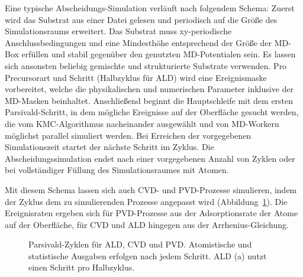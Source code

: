 Eine typische Abscheidungs-Simulation verläuft nach folgendem Schema:
Zuerst wird das Substrat aus einer Datei gelesen und periodisch auf die Größe des Simulationsraums erweitert.
Das Substrat muss xy-periodische Anschlussbedingungen und eine Mindesthöhe entsprechend der Größe der MD-Box erfüllen und stabil gegenüber den genutzten MD-Potentialen sein.
Es lassen sich ansonsten beliebig gemischte und strukturierte Substrate verwenden.
Pro Precursorart und Schritt (Halbzyklus für ALD) wird eine Ereignismaske vorbereitet, welche die physikalischen und numerischen Parameter inklusive der MD-Masken beinhaltet.
Anschließend beginnt die Hauptschleife mit dem ersten Parsivald-Schritt, in dem mögliche Ereignisse auf der Oberfläche gesucht werden, die vom KMC-Algorithmus nacheinander ausgewählt und von MD-Workern möglichst parallel simuliert werden.
Bei Erreichen der vorgegebenen Simulationszeit startet der nächste Schritt im Zyklus.
Die Abscheidungssimulation endet nach einer vorgegebenen Anzahl von Zyklen oder bei vollständiger Füllung des Simulationsraumes mit Atomen.

Mit diesem Schema lassen sich auch CVD- und PVD-Prozesse simulieren, indem der Zyklus dem zu simulierenden Prozesse angepasst wird (Abbildung~\ref{fig:parsivald-modes}).
Die Ereignisraten ergeben sich für PVD-Prozesse aus der Adsorptionsrate der Atome auf der Oberfläche, für CVD und ALD hingegen aus der Arrhenius-Gleichung.

\begin{figure}[hbp]
  \captionsetup[subfigure]{singlelinecheck=false}
  \begin{subfigure}[t]{5.7cm}
    \def\svgwidth{\textwidth}
    
  \end{subfigure}
  \hfill
  \begin{subfigure}[t]{4.7cm}
    \def\svgwidth{\textwidth}
    
  \end{subfigure}
  \hfill
  \begin{subfigure}[t]{3cm}
    \def\svgwidth{\textwidth}
    
  \end{subfigure}
  \caption[Parsivald-Zyklen für ALD, CVD und PVD]{
    Parsivald-Zyklen für ALD, CVD und PVD.
    Atomistische und statistische Ausgaben erfolgen nach jedem Schritt.
    ALD (a) nutzt einen Schritt pro Halbzyklus.
  }
  \label{fig:parsivald-modes}
\end{figure}

